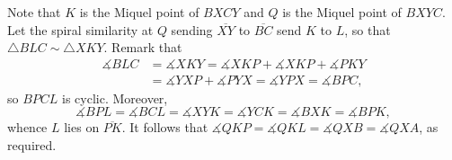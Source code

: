 Note that $K$ is the Miquel point of $BXCY$ and $Q$ is the Miquel point of $BXYC$. Let the spiral similarity at $Q$ sending $\overline{XY}$ to $\overline{BC}$ send $K$ to $L$, so that $\triangle BLC\sim\triangle XKY$. Remark that
\begin{align*}
    \measuredangle BLC&=\measuredangle XKY=\measuredangle XKP+\measuredangle XKP+\measuredangle PKY\\
    &=\measuredangle YXP+\measuredangle PYX=\measuredangle YPX=\measuredangle BPC,
\end{align*}
so $BPCL$ is cyclic. Moreover, \[\measuredangle BPL=\measuredangle BCL=\measuredangle XYK=\measuredangle YCK=\measuredangle BXK=\measuredangle BPK,\]
whence $L$ lies on $\overline{PK}$. It follows that $\measuredangle QKP=\measuredangle QKL=\measuredangle QXB=\measuredangle QXA$, as required.
